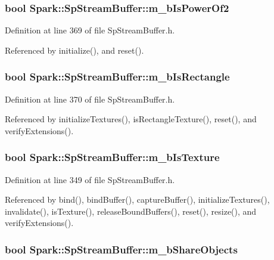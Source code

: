 \subsubsection{\setlength{\rightskip}{0pt plus 5cm}bool {\bf Spark::Sp\-Stream\-Buffer::m\_\-b\-Is\-Power\-Of2}\hspace{0.3cm}{\tt  [protected]}}\label{classSpark_1_1SpStreamBuffer_p16}


Definition at line 369 of file Sp\-Stream\-Buffer.h.

Referenced by initialize(), and reset().
\subsubsection{\setlength{\rightskip}{0pt plus 5cm}bool {\bf Spark::Sp\-Stream\-Buffer::m\_\-b\-Is\-Rectangle}\hspace{0.3cm}{\tt  [protected]}}\label{classSpark_1_1SpStreamBuffer_p17}


Definition at line 370 of file Sp\-Stream\-Buffer.h.

Referenced by initialize\-Textures(), is\-Rectangle\-Texture(), reset(), and verify\-Extensions().
\subsubsection{\setlength{\rightskip}{0pt plus 5cm}bool {\bf Spark::Sp\-Stream\-Buffer::m\_\-b\-Is\-Texture}\hspace{0.3cm}{\tt  [protected]}}\label{classSpark_1_1SpStreamBuffer_p2}


Definition at line 349 of file Sp\-Stream\-Buffer.h.

Referenced by bind(), bind\-Buffer(), capture\-Buffer(), initialize\-Textures(), invalidate(), is\-Texture(), release\-Bound\-Buffers(), reset(), resize(), and verify\-Extensions().
\subsubsection{\setlength{\rightskip}{0pt plus 5cm}bool {\bf Spark::Sp\-Stream\-Buffer::m\_\-b\-Share\-Objects}\hspace{0.3cm}{\tt  [protected]}}\label{classSpark_1_1SpStreamBuffer_p19}


